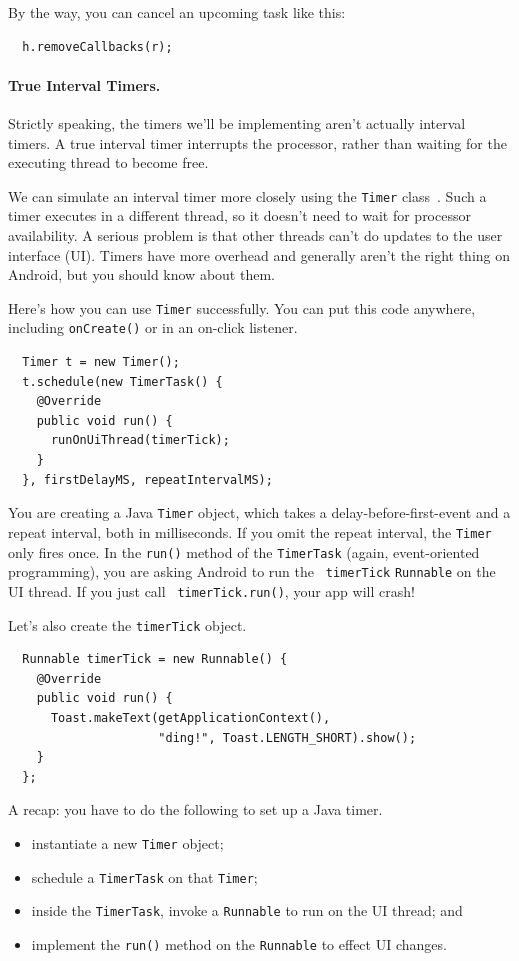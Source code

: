 By the way, you can cancel an upcoming task like this:
{\small \begin{verbatim}
  h.removeCallbacks(r);
\end{verbatim}}

\paragraph{True Interval Timers.}
Strictly speaking, the timers we'll be implementing aren't actually
interval timers. A true interval timer interrupts the processor,
rather than waiting for the executing thread to become free.

We can simulate an interval timer more closely using the {\tt Timer}
class~\cite{ody}. Such a timer executes in a different thread,
so it doesn't need to wait for processor availability. A serious
problem is that other threads can't do updates to the user interface
(UI). Timers have more overhead and generally aren't the right thing
on Android, but you should know about them.

Here's how you can use {\tt Timer} successfully. You can put this code
anywhere, including {\tt onCreate()} or in an on-click listener.

{\small \begin{verbatim}
  Timer t = new Timer();
  t.schedule(new TimerTask() {
    @Override
    public void run() {
      runOnUiThread(timerTick);
    }
  }, firstDelayMS, repeatIntervalMS);
\end{verbatim}}

You are creating a Java {\tt Timer} object, which takes a
delay-before-first-event and a repeat interval, both in
milliseconds. If you omit the repeat interval, the {\tt Timer} only
fires once. In the {\tt run()} method of the {\tt TimerTask} (again,
event-oriented programming), you are asking Android to run the {\tt
  timerTick} {\tt Runnable} on the UI thread. If you just call {\tt
  timerTick.run()}, your app will crash!

Let's also create the {\tt timerTick} object.
{\small \begin{verbatim}
  Runnable timerTick = new Runnable() {
    @Override
    public void run() {
      Toast.makeText(getApplicationContext(), 
                     "ding!", Toast.LENGTH_SHORT).show();
    }
  };
\end{verbatim}}

A recap: you have to do the following to set up a Java timer.
\begin{itemize}
\item instantiate a new {\tt Timer} object;
\item schedule a {\tt TimerTask} on that {\tt Timer};
\item inside the {\tt TimerTask}, invoke a {\tt Runnable} to run on the
UI thread; and
\item implement the {\tt run()} method on the {\tt Runnable} to effect
  UI changes.  
\end{itemize}

